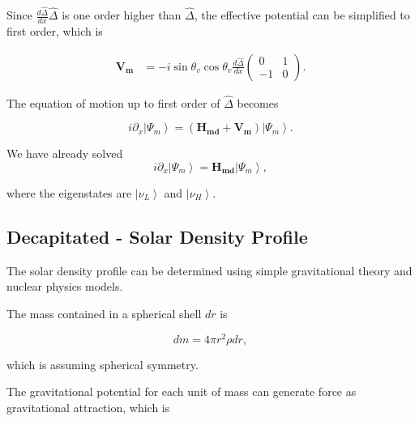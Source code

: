 \documentclass{tufte-handout}
\newcommand{\ket}[1]{\left| #1\right\rangle}
\begin{document}
Since $\frac{d\hat\Delta}{dx} \hat\Delta$ is one order higher than $\hat\Delta$, the effective potential can be simplified to first order, which is

\begin{align*}
\mathbf{V_m} & = - i\sin\theta_v \cos\theta_v \frac{d\hat\Delta}{dx} \begin{pmatrix}
0 & 1 \\
-1 & 0
\end{pmatrix}.
\end{align*}

The equation of motion up to first order of $\hat\Delta$ becomes

\begin{equation*}
i\partial_x\ket{\Psi_m} = (\mathbf{H_{md}} + \mathbf{V_m})\ket{\Psi_m}.
\end{equation*}

We have already solved
\begin{equation*}
i\partial_x\ket{\Psi_m} = \mathbf{H_{md}} \ket{\Psi_m},
\end{equation*}

where the eigenstates are $\ket{\nu_L}$ and $\ket{\nu_H}$.





















\subsection{Decapitated - Solar Density Profile}



The solar density profile can be determined using simple gravitational theory and nuclear physics models.

The mass contained in a spherical shell $dr$ is

\begin{equation}
    dm = 4\pi r^2 \rho dr ,
\end{equation}

which is assuming spherical symmetry.

The gravitational potential for each unit of mass can generate force as gravitational attraction, which is
\end{document}
